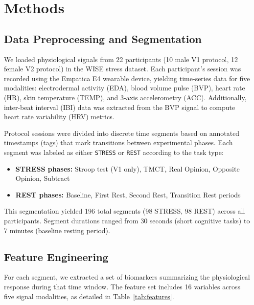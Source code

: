 \documentclass[12pt,letterpaper]{article}
\begin{document}
\section{Methods}

\subsection{Data Preprocessing and Segmentation}

We loaded physiological signals from 22 participants (10 male V1 protocol, 12 female V2 protocol) in the WISE stress dataset. Each participant's session was recorded using the Empatica E4 wearable device, yielding time-series data for five modalities: electrodermal activity (EDA), blood volume pulse (BVP), heart rate (HR), skin temperature (TEMP), and 3-axis accelerometry (ACC). Additionally, inter-beat interval (IBI) data was extracted from the BVP signal to compute heart rate variability (HRV) metrics.

Protocol sessions were divided into discrete time segments based on annotated timestamps (tags) that mark transitions between experimental phases. Each segment was labeled as either \texttt{STRESS} or \texttt{REST} according to the task type:

\begin{itemize}
    \item \textbf{STRESS phases:} Stroop test (V1 only), TMCT, Real Opinion, Opposite Opinion, Subtract
    \item \textbf{REST phases:} Baseline, First Rest, Second Rest, Transition Rest periods
\end{itemize}

This segmentation yielded 196 total segments (98 STRESS, 98 REST) across all participants. Segment durations ranged from 30 seconds (short cognitive tasks) to 7 minutes (baseline resting period).

\subsection{Feature Engineering}

For each segment, we extracted a set of biomarkers summarizing the physiological response during that time window. The feature set includes 16 variables across five signal modalities, as detailed in Table~\ref{tab:features}.
\end{document}
